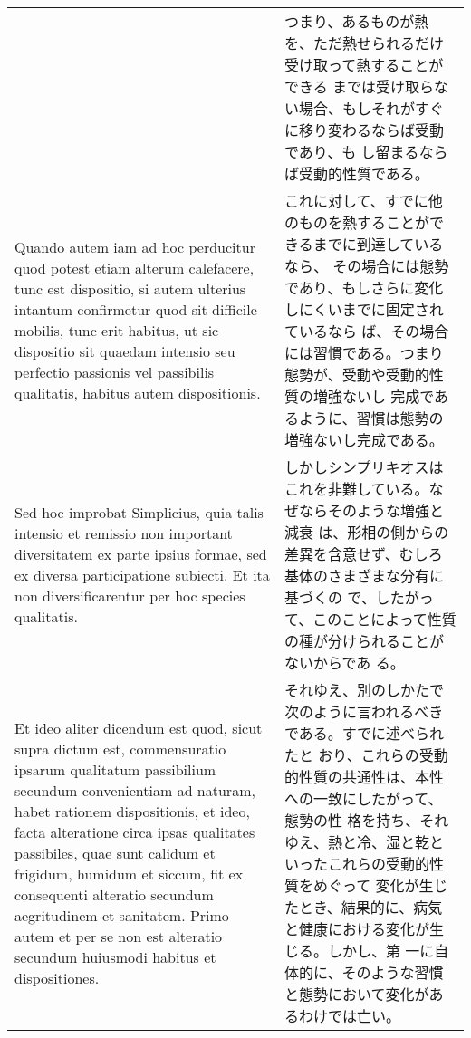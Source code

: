 \documentclass[10pt]{jsarticle} %
\begin{document}
\begin{longtable}{p{21em}p{21em}}
&

つまり、あるものが熱を、ただ熱せられるだけ受け取って熱することができる
までは受け取らない場合、もしそれがすぐに移り変わるならば受動であり、も
し留まるならば受動的性質である。

\\


Quando autem iam ad hoc perducitur quod potest etiam
alterum calefacere, tunc est dispositio, si autem ulterius intantum
confirmetur quod sit difficile mobilis, tunc erit habitus, ut sic
dispositio sit quaedam intensio seu perfectio passionis vel passibilis
qualitatis, habitus autem dispositionis. 


&

これに対して、すでに他のものを熱することができるまでに到達しているなら、
その場合には態勢であり、もしさらに変化しにくいまでに固定されているなら
ば、その場合には習慣である。つまり態勢が、受動や受動的性質の増強ないし
完成であるように、習慣は態勢の増強ないし完成である。

\\

Sed hoc improbat Simplicius, quia talis intensio et remissio non
important diversitatem ex parte ipsius formae, sed ex diversa
participatione subiecti. Et ita non diversificarentur per hoc species
qualitatis.


&

しかしシンプリキオスはこれを非難している。なぜならそのような増強と減衰
は、形相の側からの差異を含意せず、むしろ基体のさまざまな分有に基づくの
で、したがって、このことによって性質の種が分けられることがないからであ
る。

\\


Et ideo aliter dicendum est quod, sicut supra dictum est,
commensuratio ipsarum qualitatum passibilium secundum convenientiam ad
naturam, habet rationem dispositionis, et ideo, facta alteratione
circa ipsas qualitates passibiles, quae sunt calidum et frigidum,
humidum et siccum, fit ex consequenti alteratio secundum aegritudinem
et sanitatem. Primo autem et per se non est alteratio secundum
huiusmodi habitus et dispositiones.


&

それゆえ、別のしかたで次のように言われるべきである。すでに述べられたと
おり、これらの受動的性質の共通性は、本性への一致にしたがって、態勢の性
格を持ち、それゆえ、熱と冷、湿と乾といったこれらの受動的性質をめぐって
変化が生じたとき、結果的に、病気と健康における変化が生じる。しかし、第
一に自体的に、そのような習慣と態勢において変化があるわけでは亡い。


\end{longtable}
\end{document}

